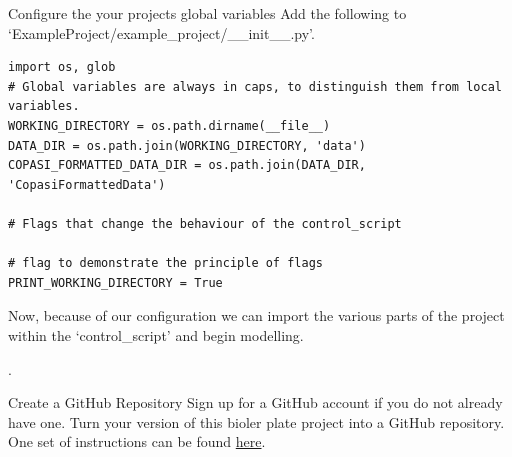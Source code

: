 \documentclass[../main]{subfiles}
\begin{document}
\begin{Task}{Configure the your projects global variables}
Add the following to `ExampleProject/example\_project/\_\_init\_\_.py'.
\begin{verbatim}
import os, glob
# Global variables are always in caps, to distinguish them from local variables.
WORKING_DIRECTORY = os.path.dirname(__file__)
DATA_DIR = os.path.join(WORKING_DIRECTORY, 'data')
COPASI_FORMATTED_DATA_DIR = os.path.join(DATA_DIR, 'CopasiFormattedData')

# Flags that change the behaviour of the control_script

# flag to demonstrate the principle of flags
PRINT_WORKING_DIRECTORY = True

\end{verbatim}
\end{Task}

Now, because of our configuration we can import the various parts of the project
within the `control\_script' and begin modelling.

.

\begin{Task}{Create a GitHub Repository}
Sign up for a GitHub account if you do not already have one. Turn your version of this bioler plate
project into a GitHub repository. One set of instructions can be found
\href{https://help.github.com/en/github/getting-started-with-github/create-a-repo}{here}.
\end{Task}
\end{document}
